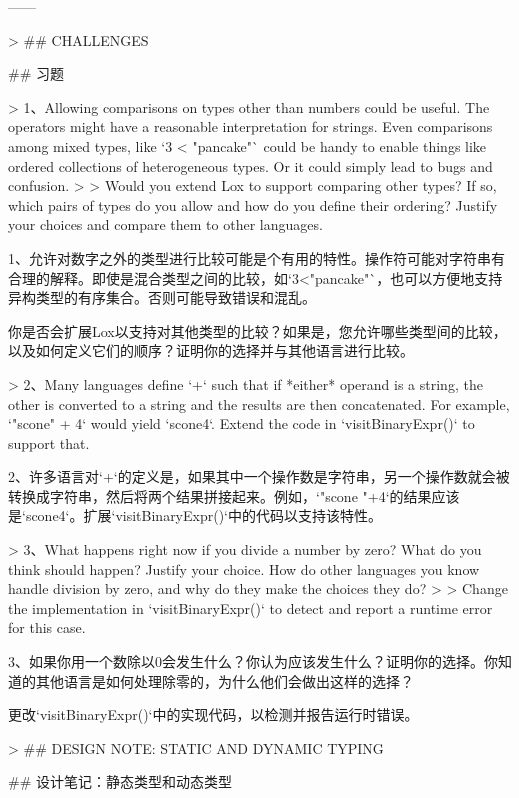 \documentclass[cn,11pt,chinese]{elegantbook}
\begin{document}
{{{------

> ## CHALLENGES

## 习题

> 1、Allowing comparisons on types other than numbers could be useful. The operators might have a reasonable interpretation for strings. Even comparisons among mixed types, like `3 < "pancake"` could be handy to enable things like ordered collections of heterogeneous types. Or it could simply lead to bugs and confusion.
>
> Would you extend Lox to support comparing other types? If so, which pairs of types do you allow and how do you define their ordering? Justify your choices and compare them to other languages.

1、允许对数字之外的类型进行比较可能是个有用的特性。操作符可能对字符串有合理的解释。即使是混合类型之间的比较，如`3<"pancake"`，也可以方便地支持异构类型的有序集合。否则可能导致错误和混乱。

你是否会扩展Lox以支持对其他类型的比较？如果是，您允许哪些类型间的比较，以及如何定义它们的顺序？证明你的选择并与其他语言进行比较。

> 2、Many languages define `+` such that if *either* operand is a string, the other is converted to a string and the results are then concatenated. For example, `"scone" + 4` would yield `scone4`. Extend the code in `visitBinaryExpr()` to support that.

2、许多语言对`+`的定义是，如果其中一个操作数是字符串，另一个操作数就会被转换成字符串，然后将两个结果拼接起来。例如，`"scone "+4`的结果应该是`scone4`。扩展`visitBinaryExpr()`中的代码以支持该特性。

> 3、What happens right now if you divide a number by zero? What do you think should happen? Justify your choice. How do other languages you know handle division by zero, and why do they make the choices they do?
>
> Change the implementation in `visitBinaryExpr()` to detect and report a runtime error for this case.

3、如果你用一个数除以0会发生什么？你认为应该发生什么？证明你的选择。你知道的其他语言是如何处理除零的，为什么他们会做出这样的选择？

更改`visitBinaryExpr()`中的实现代码，以检测并报告运行时错误。

> ## DESIGN NOTE: STATIC AND DYNAMIC TYPING

## 设计笔记：静态类型和动态类型

}}}
\end{document}
